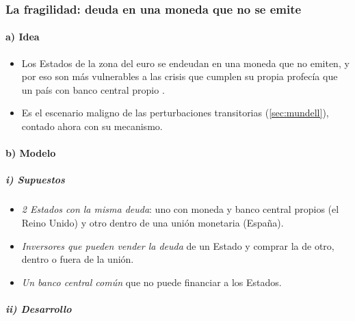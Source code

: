 \documentclass[11pt]{article}
\begin{document}
\subsubsection{La fragilidad: deuda en una moneda que no se emite}\label{sec:fragilidad}

\paragraph{a) Idea}

\begin{itemize}
\item Los Estados de la zona del euro se endeudan en una moneda que no emiten, y por eso son más vulnerables a las crisis que cumplen su propia profecía que un país con banco central propio\nocite{DeGrauwe2011Governance} .
\item Es el escenario maligno de las perturbaciones transitorias (\ref{sec:mundell}), contado ahora con su mecanismo.
\end{itemize}

\paragraph{b) Modelo}

\subparagraph{i) Supuestos}

\begin{itemize}
\item \emph{2 Estados con la misma deuda}: uno con moneda y banco central propios (el Reino Unido) y otro dentro de una unión monetaria (España).
\item \emph{Inversores que pueden vender la deuda} de un Estado y comprar la de otro, dentro o fuera de la unión.
\item \emph{Un banco central común} que no puede financiar a los Estados.
\end{itemize}

\subparagraph{ii) Desarrollo}
\end{document}

